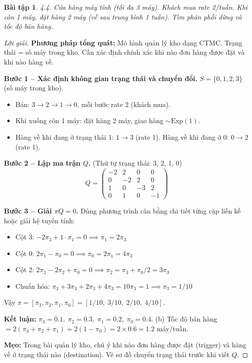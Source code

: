 \documentclass[8pt,a4paper]{article}
\newtheorem{exercise}{Bài tập}
\newenvironment{solution}{\begin{proof}[Lời giải]}{\end{proof}}
\begin{document}
\begin{exercise}
4.4. Cửa hàng máy tính (tối đa 3 máy). Khách mua rate 2/tuần. Khi còn 1 máy, đặt hàng 2 máy (về sau trung bình 1 tuần). Tìm phân phối dừng và tốc độ bán hàng.
\end{exercise}
\begin{solution}
\textbf{Phương pháp tổng quát:} Mô hình quản lý kho dạng CTMC. Trạng thái = số máy trong kho. Cần xác định chính xác khi nào đơn hàng được đặt và khi nào hàng về.

\textbf{Bước 1 -- Xác định không gian trạng thái và chuyển đổi.} $S = \{0, 1, 2, 3\}$ (số máy trong kho).
\begin{itemize}[nosep]
\item Bán: $3 \to 2 \to 1 \to 0$, mỗi bước rate 2 (khách mua).
\item Khi xuống còn 1 máy: đặt hàng 2 máy, giao hàng $\sim \text{Exp}(1)$.
\item Hàng về khi đang ở trạng thái 1: $1 \to 3$ (rate 1). Hàng về khi đang ở 0: $0 \to 2$ (rate 1).
\end{itemize}

\textbf{Bước 2 -- Lập ma trận $Q$.} (Thứ tự trạng thái: 3, 2, 1, 0)
\[
Q = \begin{pmatrix}
-2 & 2 & 0 & 0 \\
0 & -2 & 2 & 0 \\
1 & 0 & -3 & 2 \\
0 & 1 & 0 & -1
\end{pmatrix}
\]

\textbf{Bước 3 -- Giải $\pi Q = 0$.} Dùng phương trình cân bằng chi tiết từng cặp liền kề hoặc giải hệ tuyến tính:
\begin{itemize}[nosep]
\item Cột 3: $-2\pi_3 + 1\cdot\pi_1 = 0 \implies \pi_1 = 2\pi_3$
\item Cột 0: $2\pi_1 - \pi_0 = 0 \implies \pi_0 = 2\pi_1 = 4\pi_3$
\item Cột 2: $2\pi_3 - 2\pi_2 + \pi_0 = 0 \implies \pi_2 = \pi_3 + \pi_0/2 = 3\pi_3$
\item Chuẩn hóa: $\pi_3 + 3\pi_3 + 2\pi_3 + 4\pi_3 = 10\pi_3 = 1 \implies \pi_3 = 1/10$
\end{itemize}
Vậy $\pi = [\pi_3, \pi_2, \pi_1, \pi_0] = [1/10,\; 3/10,\; 2/10,\; 4/10]$.

\textbf{Kết luận:} $\boxed{\pi_3 = 0.1,\; \pi_2 = 0.3,\; \pi_1 = 0.2,\; \pi_0 = 0.4}$.
(b) Tốc độ bán hàng $= 2(\pi_3 + \pi_2 + \pi_1) = 2(1 - \pi_0) = 2 \times 0.6 = \boxed{1.2}$ máy/tuần.

\textbf{Mẹo:} Trong bài quản lý kho, chú ý khi nào đơn hàng được đặt (trigger) và hàng về ở trạng thái nào (destination). Vẽ sơ đồ chuyển trạng thái trước khi viết $Q$.
\end{solution}
\end{document}
